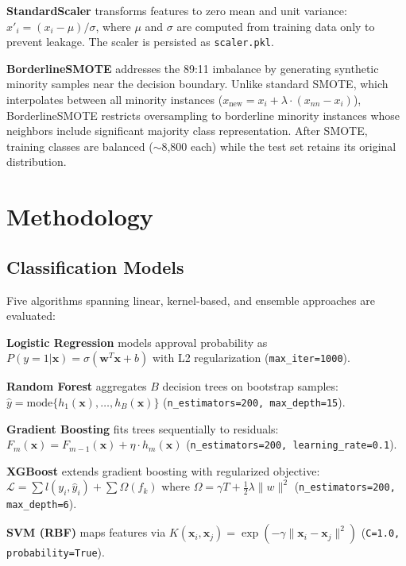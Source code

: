 \documentclass[12pt]{report}
\begin{document}
\textbf{StandardScaler} transforms features to zero mean and unit variance: $x'_i = (x_i - \mu)/\sigma$, where $\mu$ and $\sigma$ are computed from training data only to prevent leakage. The scaler is persisted as \texttt{scaler.pkl}.

\textbf{BorderlineSMOTE} addresses the 89:11 imbalance by generating synthetic minority samples near the decision boundary. Unlike standard SMOTE, which interpolates between all minority instances ($x_{\text{new}} = x_i + \lambda \cdot (x_{nn} - x_i)$), BorderlineSMOTE restricts oversampling to borderline minority instances whose neighbors include significant majority class representation. After SMOTE, training classes are balanced ($\sim$8,800 each) while the test set retains its original distribution.



\chapter{Methodology}

\section{Classification Models}

Five algorithms spanning linear, kernel-based, and ensemble approaches are evaluated:

\textbf{Logistic Regression} models approval probability as $P(y{=}1|\mathbf{x}) = \sigma(\mathbf{w}^T\mathbf{x} + b)$ with L2 regularization (\texttt{max\_iter=1000}).

\textbf{Random Forest} aggregates $B$ decision trees on bootstrap samples: $\hat{y} = \text{mode}\{h_1(\mathbf{x}), \ldots, h_B(\mathbf{x})\}$ (\texttt{n\_estimators=200, max\_depth=15}).

\textbf{Gradient Boosting} fits trees sequentially to residuals: $F_m(\mathbf{x}) = F_{m-1}(\mathbf{x}) + \eta \cdot h_m(\mathbf{x})$ (\texttt{n\_estimators=200, learning\_rate=0.1}).

\textbf{XGBoost} extends gradient boosting with regularized objective: $\mathcal{L} = \sum l(y_i, \hat{y}_i) + \sum \Omega(f_k)$ where $\Omega = \gamma T + \frac{1}{2}\lambda\|w\|^2$ (\texttt{n\_estimators=200, max\_depth=6}).

\textbf{SVM (RBF)} maps features via $K(\mathbf{x}_i, \mathbf{x}_j) = \exp(-\gamma\|\mathbf{x}_i - \mathbf{x}_j\|^2)$ (\texttt{C=1.0, probability=True}).
\end{document}
